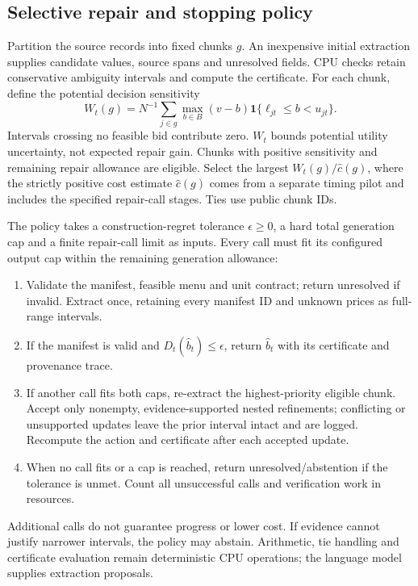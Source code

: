 \documentclass[sigconf,anonymous,nonacm]{acmart}
\begin{document}
\subsection{Selective repair and stopping policy}
Partition the source records into fixed chunks $g$. An inexpensive initial extraction supplies candidate values, source spans and unresolved fields. CPU checks retain conservative ambiguity intervals and compute the certificate. For each chunk, define the potential decision sensitivity
\[
W_t(g)=N^{-1}\sum_{j\in g}\max_{b\in B}
(v-b)\mathbf1\{\ell_{jt}\leq b<u_{jt}\}.
\]
Intervals crossing no feasible bid contribute zero. $W_t$ bounds potential utility uncertainty, not expected repair gain. Chunks with positive sensitivity and remaining repair allowance are eligible. Select the largest $W_t(g)/\widehat c(g)$, where the strictly positive cost estimate $\widehat c(g)$ comes from a separate timing pilot and includes the specified repair-call stages. Ties use public chunk IDs.

The policy takes a construction-regret tolerance $\epsilon\geq0$, a hard total generation cap and a finite repair-call limit as inputs. Every call must fit its configured output cap within the remaining generation allowance:
\begin{enumerate}
\item Validate the manifest, feasible menu and unit contract; return unresolved if invalid. Extract once, retaining every manifest ID and unknown prices as full-range intervals.
\item If the manifest is valid and $D_t(\widehat b_t)\leq\epsilon$, return $\widehat b_t$ with its certificate and provenance trace.
\item If another call fits both caps, re-extract the highest-priority eligible chunk. Accept only nonempty, evidence-supported nested refinements; conflicting or unsupported updates leave the prior interval intact and are logged. Recompute the action and certificate after each accepted update.
\item When no call fits or a cap is reached, return unresolved/abstention if the tolerance is unmet. Count all unsuccessful calls and verification work in resources.
\end{enumerate}
Additional calls do not guarantee progress or lower cost. If evidence cannot justify narrower intervals, the policy may abstain. Arithmetic, tie handling and certificate evaluation remain deterministic CPU operations; the language model supplies extraction proposals.
\end{document}
